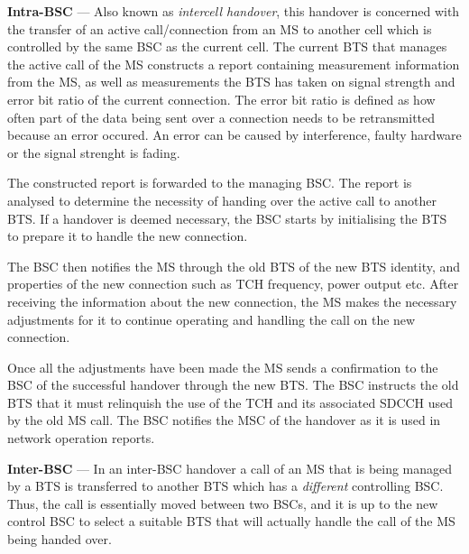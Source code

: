 \begin{description}
\item{\textbf{Intra-BSC}} --- Also known as \emph{intercell handover}, this handover is concerned with the transfer of an active call/connection from an \gls{MS} to another cell which is controlled by the same \gls{BSC} as the current cell\cite{wirelesstelcoMullet,GSMArchitectureProtocolsServices}. The current \gls{BTS} that manages the active call of the \gls{MS} constructs a report containing measurement information from the MS, as well as measurements the \gls{BTS} has taken on signal strength and error bit ratio of the current connection\cite{wirelesstelcoMullet,GSMArchitectureProtocolsServices}. The error bit ratio is defined as how often part of the data being sent over a connection needs to be retransmitted because an error occured\cite{wirelesstelcoMullet,GSMArchitectureProtocolsServices}. An error can be caused by interference, faulty hardware or the signal strenght is fading\cite{wirelesstelcoMullet,GSMArchitectureProtocolsServices}. 

  The constructed report is forwarded to the managing \gls{BSC}. The report is analysed to determine the necessity of handing over the active call to another \gls{BTS}\@. If a handover is deemed necessary, the \gls{BSC} starts by initialising the \gls{BTS} to prepare it to handle the new connection\cite{wirelesstelcoMullet,GSMArchitectureProtocolsServices}.

The \gls{BSC} then notifies the \gls{MS} through the old \gls{BTS} of the new \gls{BTS} identity, and properties of the new connection such as \gls{TCH} frequency, power output etc. After receiving the information about the new connection, the \gls{MS} makes the necessary adjustments for it to continue operating and handling the call on the new connection\cite{wirelesstelcoMullet,GSMArchitectureProtocolsServices}. 

Once all the adjustments have been made the \gls{MS} sends a confirmation to the \gls{BSC} of the successful handover through the new \gls{BTS}\@. The \gls{BSC} instructs the old \gls{BTS} that it must relinquish the use of the \gls{TCH} and its associated \gls{SDCCH} used by the old \gls{MS} call. The \gls{BSC} notifies the \gls{MSC} of the handover as it is used in network operation reports\cite{wirelesstelcoMullet,GSMArchitectureProtocolsServices}.
\item{\textbf{Inter-BSC}} --- In an inter-\gls{BSC} handover a call of an \gls{MS} that is being managed by a \gls{BTS} is transferred to another \gls{BTS} which has a \emph{different} controlling \gls{BSC}\@. Thus, the call is essentially moved between two \glspl{BSC}, and it is up to the new control \gls{BSC} to select a suitable \gls{BTS} that will actually handle the call of the \gls{MS} being handed over\cite{wirelesstelcoMullet,GSMArchitectureProtocolsServices}.


\end{description}
